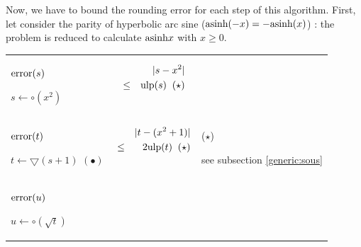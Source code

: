 \documentclass[12pt]{amsart}
\def\n{\textnormal}
\def\minf{\bigtriangledown}
\def\ulp{{\rm ulp}}
\begin{document}
Now, we have to bound the rounding error for each step of this
algorithm.  First, let consider the parity of hyperbolic arc sine
($\n{asinh}(-x)=-\n{asinh}(x)$) : the problem is reduced to calculate $\n{asinh} x$
with $x \geq 0$.

\begin{center}
\begin{tabular}{l l l}

\begin{minipage}{2.5cm}
${\textnormal{error}}(s)$


$s \leftarrow \circ(x^2) $

\end{minipage} &
\begin{minipage}{7.5cm}

\begin{eqnarray}\nonumber
  &&|s-x^2| \\\nonumber
  &       \leq&  \ulp(s)\;\;(\star)\\\nonumber
\end{eqnarray}


\end{minipage} &
\begin{minipage}{6cm}

\end{minipage}\\%
\begin{minipage}{2.5cm}
${\textnormal{error}}(t)$


$t \leftarrow \minf(s+1) $
$(\bullet)$
\end{minipage} &
\begin{minipage}{7.5cm}



\begin{eqnarray}\nonumber
  &&|t-(x^2+1)| \\\nonumber
  &       \leq&  2 \ulp(t) \;\;(\star)\\\nonumber
\end{eqnarray}


\end{minipage} &
\begin{minipage}{6cm}

($\star$)

see subsection \ref{generic:sous}


\end{minipage}\\%
\begin{minipage}{2.5cm}
${\textnormal{error}}(u)$


$u \leftarrow \circ(\sqrt{t}) $



\end{minipage}
\end{tabular}
\end{center}
\end{document}
